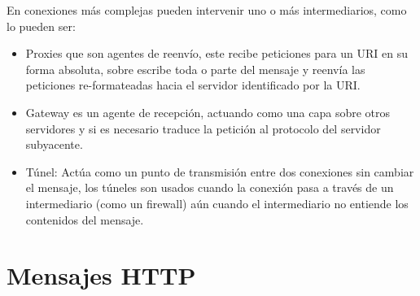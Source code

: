 En conexiones más complejas pueden intervenir uno o más intermediarios, como lo pueden ser:

  \begin{itemize}
     \item Proxies que son agentes de reenvío, este recibe peticiones para un URI en su forma absoluta, sobre escribe toda o parte del mensaje y reenvía las peticiones re-formateadas hacia el servidor identificado por la URI.
     \item Gateway es un agente de recepción, actuando como una capa sobre otros servidores y si es necesario traduce la petición al protocolo del servidor subyacente.
     \item Túnel: Actúa como un punto de transmisión entre dos conexiones sin cambiar el mensaje, los túneles son usados cuando la conexión pasa a través de un intermediario (como un firewall) aún cuando el intermediario no entiende los contenidos del mensaje.
  \end{itemize}


\section{Mensajes HTTP}


